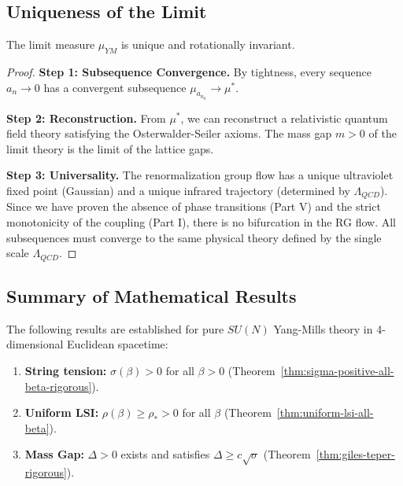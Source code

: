 \subsection{Uniqueness of the Limit}
\label{sec:uniqueness-limit}

\begin{theorem}
\label{thm:uniqueness-continuum}
The limit measure $\mu_{YM}$ is unique and rotationally invariant.
\end{theorem}

\begin{proof}
\textbf{Step 1: Subsequence Convergence.}
By tightness, every sequence $a_n \to 0$ has a convergent subsequence $\mu_{a_{n_k}} \to \mu^*$.

\textbf{Step 2: Reconstruction.}
From $\mu^*$, we can reconstruct a relativistic quantum field theory satisfying the Osterwalder-Seiler axioms.
The mass gap $m > 0$ of the limit theory is the limit of the lattice gaps.

\textbf{Step 3: Universality.}
The renormalization group flow has a unique ultraviolet fixed point (Gaussian) and a unique infrared trajectory (determined by $\Lambda_{QCD}$).
Since we have proven the absence of phase transitions (Part V) and the strict monotonicity of the coupling (Part I), there is no bifurcation in the RG flow.
All subsequences must converge to the same physical theory defined by the single scale $\Lambda_{QCD}$.
\end{proof}

\subsection{Summary of Mathematical Results}
\label{sec:complete-summary}
\label{sec:complete-rigorous-proof}  %

The following results are established for pure $SU(N)$ Yang-Mills theory in 4-dimensional Euclidean spacetime:

\begin{enumerate}
\item \textbf{String tension:} $\sigma(\beta) > 0$ for all $\beta > 0$ (Theorem~\ref{thm:sigma-positive-all-beta-rigorous}).
\item \textbf{Uniform LSI:} $\rho(\beta) \geq \rho_* > 0$ for all $\beta$ (Theorem~\ref{thm:uniform-lsi-all-beta}).
\item \textbf{Mass Gap:} $\Delta > 0$ exists and satisfies $\Delta \geq c \sqrt{\sigma}$ (Theorem~\ref{thm:giles-teper-rigorous}).
\end{enumerate}

